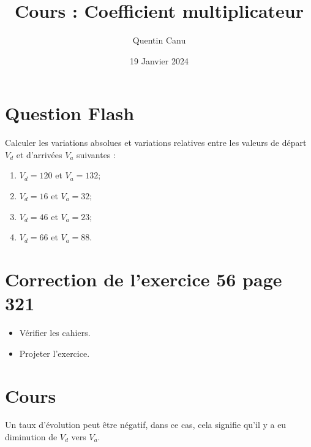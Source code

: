 \documentclass{article}
\title{Cours : Coefficient multiplicateur}
\author{Quentin Canu}
\date{19 Janvier 2024}
\begin{document}
\maketitle
\section{Question Flash}
Calculer les variations absolues et variations relatives entre les valeurs de départ $V_d$ et d'arrivées $V_a$ suivantes :
\begin{enumerate}[label=\alph*)]
\item $V_d = 120$ et $V_a = 132$;
\item $V_d = 16$ et $V_a = 32$;
\item $V_d = 46$ et $V_a = 23$;
\item $V_d = 66$ et $V_a = 88$.
\end{enumerate}
\section{Correction de l'exercice 56 page 321}
\begin{itemize}
\item Vérifier les cahiers.
\item Projeter l'exercice.
\end{itemize}
\section{Cours}
\begin{remark}
Un taux d'évolution peut être négatif, dans ce cas, cela signifie qu'il y a eu diminution de $V_d$ vers $V_a$.
\end{remark}
\end{document}
